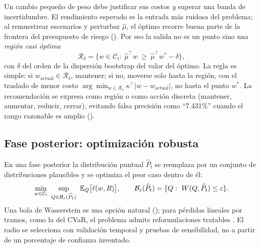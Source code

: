 Un cambio pequeño de peso debe justificar sus costos \emph{y} superar una banda de incertidumbre. El
rendimiento esperado es la entrada más ruidosa del problema; al remuestrear escenarios y perturbar
$\hat\mu$, el óptimo recorre buena parte de la frontera del presupuesto de riesgo
(). Por eso la salida no es un punto sino una \emph{región casi óptima}
\begin{equation}
\mathcal R_\delta=\bigl\{w\in\mathcal C_t:\ \hat\mu^\top w\ \ge\ \hat\mu^\top w^\ast-\delta\bigr\},
\label{eq:region}
\end{equation}
con $\delta$ del orden de la dispersión bootstrap del valor del óptimo. La regla es simple: si
$w_{\text{actual}}\in\mathcal R_\delta$, mantener; si no, moverse solo hasta la región, con el traslado de
menor costo $\arg\min_{w\in\mathcal R_\delta}\kappa^\top|w-w_{\text{actual}}|$, no hasta el punto
$w^\ast$. La recomendación se expresa como región o como acción discreta (mantener, aumentar, reducir,
cerrar), evitando falsa precisión como ``7.431\%'' cuando el rango razonable es amplio
().



\subsection{Fase posterior: optimización robusta}\label{sec:dro}

En una fase posterior la distribución puntual $\widehat P_t$ se reemplaza por un conjunto de
distribuciones plausibles y se optimiza el peor caso dentro de él:
\begin{equation}
\min_{w\in\mathcal C_t}\ \sup_{Q\in\mathcal B_\varepsilon(\widehat P_t)}\ \mathbb{E}_Q\bigl[\ell(w,R)\bigr],
\qquad \mathcal B_\varepsilon(\widehat P_t)=\{Q:\ W(Q,\widehat P_t)\le\varepsilon\}.
\label{eq:dro}
\end{equation}
Una bola de Wasserstein es una opción natural (); para pérdidas lineales por
tramos, como la del CVaR, el problema admite reformulaciones tratables \citep{esfahani2018}. El radio se
selecciona con validación temporal y pruebas de sensibilidad, no a partir de un porcentaje de confianza
inventado.

